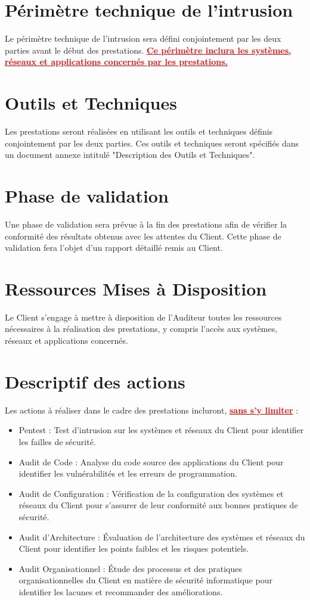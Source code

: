 \documentclass[12pt]{extarticle}
\begin{document}
\section{Périmètre technique de l’intrusion}
Le périmètre technique de l'intrusion sera défini conjointement par les deux parties avant le début des prestations. \textcolor{red}{\textbf{\underline{Ce périmètre inclura les systèmes, réseaux et applications concernés par les prestations.}}}
\section{Outils et Techniques}
Les prestations seront réalisées en utilisant les outils et techniques définis conjointement par les deux parties. Ces outils et techniques seront spécifiés dans un document annexe intitulé "Description des Outils et Techniques".
\section{Phase de validation}
Une phase de validation sera prévue à la fin des prestations afin de vérifier la conformité des résultats obtenus avec les attentes du Client. Cette phase de validation fera l'objet d'un rapport détaillé remis au Client.
\section{Ressources Mises à Disposition}
Le Client s'engage à mettre à disposition de l'Auditeur toutes les ressources nécessaires à la réalisation des prestations, y compris l'accès aux systèmes, réseaux et applications concernés.
\section{Descriptif des actions}
Les actions à réaliser dans le cadre des prestations incluront, \textcolor{red}{\textbf{\underline{sans s'y limiter}}} :
\begin{itemize}
    \item Pentest : Test d'intrusion sur les systèmes et réseaux du Client pour identifier les failles de sécurité.
    \item Audit de Code : Analyse du code source des applications du Client pour identifier les vulnérabilités et les erreurs de programmation.
    \item Audit de Configuration : Vérification de la configuration des systèmes et réseaux du Client pour s'assurer de leur conformité aux bonnes pratiques de sécurité.
    \item Audit d'Architecture : Évaluation de l'architecture des systèmes et réseaux du Client pour identifier les points faibles et les risques potentiels.
    \item Audit Organisationnel : Étude des processus et des pratiques organisationnelles du Client en matière de sécurité informatique pour identifier les lacunes et recommander des améliorations.
\end{itemize}
\newpage
\end{document}
